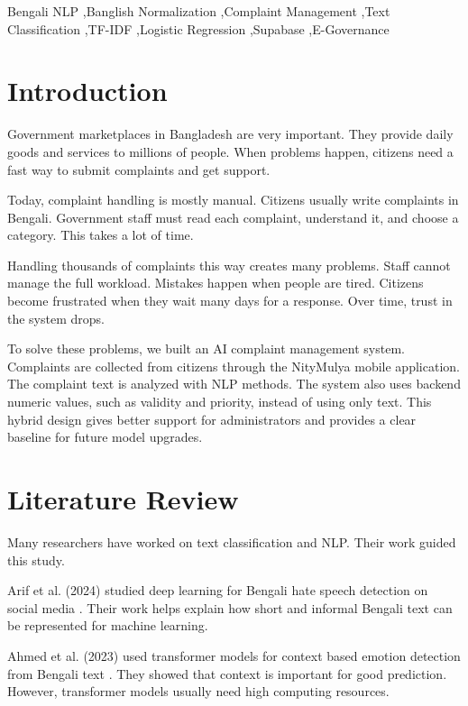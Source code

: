 \documentclass[a4paper,fleqn]{cas-dc}
\begin{document}
\begin{keywords}
Bengali NLP \sep Banglish Normalization \sep Complaint Management \sep Text Classification \sep TF-IDF \sep Logistic Regression \sep Supabase \sep E-Governance
\end{keywords}

\maketitle

\section{Introduction}

Government marketplaces in Bangladesh are very important. They provide daily goods and services to millions of people. When problems happen, citizens need a fast way to submit complaints and get support. 

Today, complaint handling is mostly manual. Citizens usually write complaints in Bengali. Government staff must read each complaint, understand it, and choose a category. This takes a lot of time. 

Handling thousands of complaints this way creates many problems. Staff cannot manage the full workload. Mistakes happen when people are tired. Citizens become frustrated when they wait many days for a response. Over time, trust in the system drops.

To solve these problems, we built an AI complaint management system. Complaints are collected from citizens through the NityMulya mobile application. The complaint text is analyzed with NLP methods. The system also uses backend numeric values, such as validity and priority, instead of using only text. This hybrid design gives better support for administrators and provides a clear baseline for future model upgrades.

\section{Literature Review}

Many researchers have worked on text classification and NLP. Their work guided this study.

Arif et al. (2024) studied deep learning for Bengali hate speech detection on social media \cite{arif2024}. Their work helps explain how short and informal Bengali text can be represented for machine learning.

Ahmed et al. (2023) used transformer models for context based emotion detection from Bengali text \cite{ahmed2023}. They showed that context is important for good prediction. However, transformer models usually need high computing resources.
\end{document}
